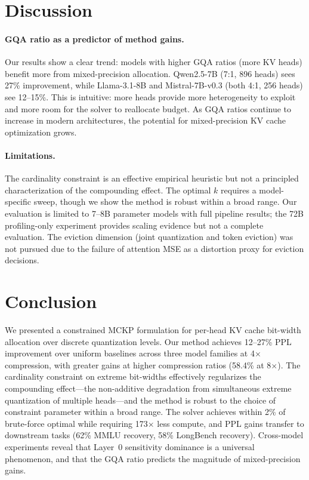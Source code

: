 \documentclass[11pt,a4paper]{article}
\begin{document}
\section{Discussion}
\label{sec:discussion}

\paragraph{GQA ratio as a predictor of method gains.}
Our results show a clear trend: models with higher GQA ratios (more KV heads) benefit more from mixed-precision allocation.
Qwen2.5-7B (7:1, 896 heads) sees 27\% improvement, while Llama-3.1-8B and Mistral-7B-v0.3 (both 4:1, 256 heads) see 12--15\%.
This is intuitive: more heads provide more heterogeneity to exploit and more room for the solver to reallocate budget.
As GQA ratios continue to increase in modern architectures, the potential for mixed-precision KV cache optimization grows.

\paragraph{Limitations.}
The cardinality constraint is an effective empirical heuristic but not a principled characterization of the compounding effect.
The optimal $k$ requires a model-specific sweep, though we show the method is robust within a broad range.
Our evaluation is limited to 7--8B parameter models with full pipeline results; the 72B profiling-only experiment provides scaling evidence but not a complete evaluation.
The eviction dimension (joint quantization and token eviction) was not pursued due to the failure of attention MSE as a distortion proxy for eviction decisions.

\section{Conclusion}
\label{sec:conclusion}

We presented a constrained MCKP formulation for per-head KV cache bit-width allocation over discrete quantization levels.
Our method achieves 12--27\% PPL improvement over uniform baselines across three model families at 4$\times$ compression, with greater gains at higher compression ratios (58.4\% at 8$\times$).
The cardinality constraint on extreme bit-widths effectively regularizes the compounding effect---the non-additive degradation from simultaneous extreme quantization of multiple heads---and the method is robust to the choice of constraint parameter within a broad range.
The solver achieves within 2\% of brute-force optimal while requiring 173$\times$ less compute, and PPL gains transfer to downstream tasks (62\% MMLU recovery, 58\% LongBench recovery).
Cross-model experiments reveal that Layer~0 sensitivity dominance is a universal phenomenon, and that the GQA ratio predicts the magnitude of mixed-precision gains.
\end{document}
